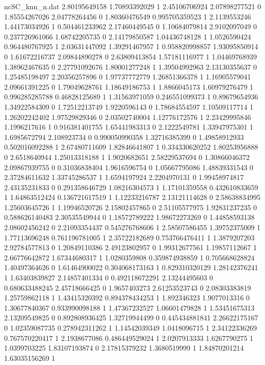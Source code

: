 \begin{filecontents}{ncSC_knn_n.dat}
2.80195649158 1.70893392029 1
2.45106706924 2.07898277521 0
1.85554267026 2.04778264456 0
1.80360476549 0.995705359523 1
2.1139553246 1.44173034926 1
0.504461233962 2.17460449545 0
1.10684079814 2.9102097049 0
0.237726961066 1.68742205735 0
2.14179850587 1.04436748128 1
1.0526590424 0.964480767925 1
2.03631447092 1.39291467957 1
0.958820998857 1.93095850914 0
1.61672216737 2.09844890278 0
2.63809413854 1.57181116977 1
1.04469768939 1.38962467635 0
2.27791092676 1.80001277248 1
1.39504992963 2.13130355637 0
1.25485198497 2.20356257896 0
1.97737772779 1.26851366378 1
1.16905579041 2.09661391225 0
1.79049628761 1.18649186753 1
1.8866045173 1.60979276479 1
0.996285285788 0.46828125689 1
1.31563971059 0.246551099373 1
0.89679654936 1.34922584309 0
1.72512213749 1.9220596143 0
1.78684554597 1.10509117714 1
1.26202242402 1.97529829346 0
2.03502740004 1.12776172576 1
2.23429995846 1.1996217616 1
0.916381401755 1.65441983313 0
2.1222549781 1.33947975301 1
1.6985672794 2.108923734 0
0.990050990358 1.32716385399 0
1.49858912933 0.502016092288 1
2.67480711609 1.82846641807 1
0.334330620252 1.80253956888 0
2.6518640944 1.25013318188 1
1.9020682651 2.58229537694 0
1.30866046372 2.09867939755 0
0.31036838404 1.9616596754 0
1.05667795086 1.48839331543 0
2.37284611632 1.33745286537 1
1.6594197924 2.2204970131 0
1.99458974817 2.43135231833 0
0.291358646729 1.08216304573 1
1.17101359558 0.432610833659 1
1.64863512424 0.136721617519 1
1.12233216787 2.13121114628 0
2.58638834995 1.25603645726 1
1.19946520726 2.15802457865 0
2.51105577975 1.92831237235 0
0.588626140483 2.30535549944 0
1.18572789222 1.98672273269 0
1.44858593138 2.08602456242 0
2.21093354437 0.545276768606 1
2.58507586455 1.39752375009 1
1.77113696248 0.761196781005 1
2.35722182689 0.753766476411 1
1.3879207203 2.92784577813 0
1.20849110386 2.49123802957 0
1.99312677561 1.19857112667 1
2.66776642872 1.67344680317 1
1.0280359808 0.359874938859 1
0.705668628824 1.40497364626 0
1.61464900022 0.304068173163 1
0.829310320129 1.28142376241 1
1.63403839827 2.14857401334 0
0.492118672291 2.13244495603 0
0.680633488245 2.45718666425 0
1.9657403273 2.61253523743 0
2.08303383819 1.25759862118 1
1.43415320392 0.894378434253 1
1.892346323 1.9077013316 0
1.30677840367 0.933990098188 1
1.47367232527 1.06601479828 1
1.53451675313 2.13209549825 0
0.892808936425 1.32719944499 0
0.445434881841 2.26622175167 0
1.02359087735 0.278942311262 1
1.14542039349 1.0418096715 1
2.34122336269 0.767570220417 1
2.1938677086 0.486449529024 1
2.0207913333 1.6267790275 1
1.0399703225 1.83107193874 0
2.17815379232 1.3680519999 1
1.84870201214 1.63035156269 1

\end{filecontents}
